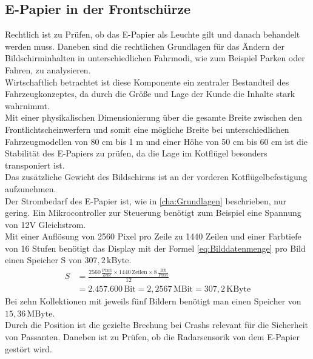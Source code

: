 \subsection{E-Papier in der Frontschürze}
Rechtlich ist zu Prüfen, ob das E-Papier als Leuchte gilt und danach behandelt werden muss. Daneben sind die rechtlichen Grundlagen für das Ändern der Bildschirminhalten in unterschiedlichen Fahrmodi, wie zum Beispiel Parken oder Fahren, zu analysieren. \\
Wirtschaftlich betrachtet ist diese Komponente ein zentraler Bestandteil des Fahrzeugkonzeptes, da durch die Größe und Lage der Kunde die Inhalte stark wahrnimmt. \\
Mit einer physikalischen Dimensionierung über die gesamte Breite zwischen den Frontlichtscheinwerfern und somit eine mögliche Breite bei unterschiedlichen Fahrzeugmodellen von 80 cm bis 1 m und einer Höhe von 50 cm bis 60 cm ist die Stabilität des E-Papiers zu prüfen, da die Lage im Kotflügel besonders transponiert ist. \\ 
Das zusätzliche Gewicht des Bildschirms ist an der vorderen Kotflügelbefestigung aufzunehmen.\\
Der Strombedarf des E-Papier ist, wie in \ref{cha:Grundlagen} beschrieben, nur gering. Ein Mikrocontroller zur Steuerung benötigt zum Beispiel eine Spannung von 12V Gleichstrom. \\
Mit einer Auflösung von 2560 Pixel pro Zeile zu 1440 Zeilen und einer Farbtiefe von 16 Stufen benötigt das Display mit der Formel \ref{eq:Bilddatenmenge} pro Bild einen Speicher S von $ 307,2\,\mathrm{kByte} $. 
\begin{align}
	S &= \frac{2560\,\frac{\mathrm{Pixel}}{\mathrm{Zeile}}\times 1440\,\mathrm{Zeilen} \times 8\,\frac{\mathrm{Bit}}{\mathrm{Pixel}}}{12} \\
	&= 2.457.600\,\mathrm{Bit} = 2,2567\,\mathrm{MBit} = 307,2\,\mathrm{KByte}
\end{align}
Bei zehn Kollektionen mit jeweils fünf Bildern benötigt man einen Speicher von $ 15,36\,\mathrm{MByte} $. \\
Durch die Position ist die gezielte Brechung bei Crashs relevant für die Sicherheit von Passanten.
Daneben ist zu Prüfen, ob die Radarsensorik von dem E-Papier gestört wird.\\
